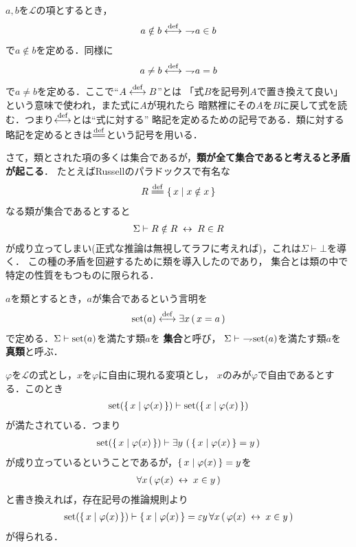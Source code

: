 	$a,b$を$\mathcal{L}$の項とするとき，
	\begin{align}
		a \notin b \overset{\mathrm{def}}{\longleftrightarrow}\ \rightharpoondown\hspace{-0.25em} a \in b
	\end{align}
	で$a \notin b$を定める．同様に
	\begin{align}
		a \neq b \overset{\mathrm{def}}{\longleftrightarrow}\ \rightharpoondown\hspace{-0.25em} a = b
	\end{align}
	で$a \neq b$を定める．ここで``$A \overset{\mathrm{def}}{\longleftrightarrow} B$''とは
	「式$B$を記号列$A$で置き換えて良い」という意味で使われ，また式に$A$が現れたら
	暗黙裡にその$A$を$B$に戻して式を読む．つまり$\overset{\mathrm{def}}{\longleftrightarrow}$とは``式に対する''
	略記を定めるための記号である．類に対する略記を定めるときは$\defeq$という記号を用いる．
	
	さて，類とされた項の多くは集合であるが，{\bf 類が全て集合であると考えると矛盾が起こる}．
	たとえばRussellのパラドックスで有名な
	\begin{align}
		R \defeq \Set{x}{x \notin x}
	\end{align}
	なる類が集合であるとすると
	\begin{align}
		\Sigma \vdash R \notin R \hspace{0.25em}\leftrightarrow\hspace{0.25em} R \in R
	\end{align}
	が成り立ってしまい(正式な推論は無視してラフに考えれば)，これは$\Sigma \vdash \bot$を導く．
	この種の矛盾を回避するために類を導入したのであり，
	集合とは類の中で特定の性質をもつものに限られる．
	
	\begin{screen}
		\begin{dfn}[集合]
			$a$を類とするとき，$a$が集合であるという言明を
			\begin{align}
				\operatorname*{set} (a) \overset{\mathrm{def}}{\longleftrightarrow} \exists x\, (\, x = a\, )
			\end{align}
			で定める．$\Sigma \vdash \operatorname*{set} (a)$を満たす類$a$を
			{\bf 集合}と呼び，
			$\Sigma \vdash\ \rightharpoondown\hspace{-0.25em} \operatorname*{set} (a)$を満たす類$a$を
			{\bf 真類}と呼ぶ．
		\end{dfn}
	\end{screen}
	
	$\varphi$を$\mathcal{L}$の式とし，$x$を$\varphi$に自由に現れる変項とし，
	$x$のみが$\varphi$で自由であるとする．このとき
	\begin{align}
		\operatorname*{set} (\left\{\, x \mid \varphi(x)\, \right\}) \vdash \operatorname*{set} (\left\{\, x \mid \varphi(x)\, \right\})
	\end{align}
	が満たされている．つまり
	\begin{align}
		\operatorname*{set} (\left\{\, x \mid \varphi(x)\, \right\})
		\vdash \exists y\, \left(\, \left\{\, x \mid \varphi(x)\, \right\} = y\, \right)
	\end{align}
	が成り立っているということであるが，$\left\{\, x \mid \varphi(x)\, \right\} = y$を
	\begin{align}
		\forall x\, (\, \varphi(x) \hspace{0.25em}\leftrightarrow\hspace{0.25em} x \in y\, )
	\end{align}
	と書き換えれば，存在記号の推論規則より
	\begin{align}
		\operatorname*{set} (\left\{\, x \mid \varphi(x)\, \right\}) \vdash \left\{\, x \mid \varphi(x)\, \right\} = 
		\varepsilon y\, \forall x\, (\, \varphi(x) \hspace{0.25em}\leftrightarrow\hspace{0.25em} x \in y\, )
	\end{align}
	が得られる．
	
